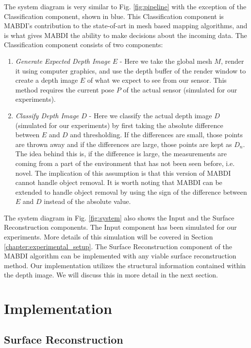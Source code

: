 The system diagram is very similar to Fig. \ref{fig:pipeline} with the exception
of the Classification component, shown in blue. This Classification component is
MABDI's contribution to the state-of-art in mesh based mapping algorithms, and
is what gives MABDI the ability to make decisions about the incoming data. The
Classification component consists of two components:
\begin{enumerate}
    \item \textit{Generate Expected Depth Image $E$} - Here we take the global
    mesh $M$, render it using computer graphics, and use the depth buffer of the
    render window to create a depth image $E$ of what we expect to see from our
    sensor. This method requires the current pose $P$ of the actual sensor
    (simulated for our experiments).
    \item \textit{Classify Depth Image $D$} - Here we classify the actual depth
    image $D$ (simulated for our experiments) by first taking the absolute
    difference between $E$ and $D$ and thresholding. If the differences are
    small, those points are thrown away and if the differences are large, those
    points are kept as $D_n$. The idea behind this is, if the difference is
    large, the measurements are coming from a part of the environment that has
    not been seen before, i.e. novel. The implication of this assumption is that
    this version of MABDI cannot handle object removal. It is worth noting
    that MABDI can be extended to handle object removal by using the sign of the
    difference between $E$ and $D$ instead of the absolute value.
\end{enumerate}

The system diagram in Fig. \ref{fig:system} also shows the Input and the Surface
Reconstruction components. The Input component has been simulated for our
experiments. More details of this simulation will be covered in Section
\ref{chapter:experimental_setup}. The Surface Reconstruction component of the
MABDI algorithm can be implemented with any viable surface reconstruction
method. Our implementation utilizes the structural information contained within
the depth image. We will discuss this in more detail in the next section.

\section{Implementation}

\subsection{Surface Reconstruction}
\label{subsection:surface_reconstruction}

